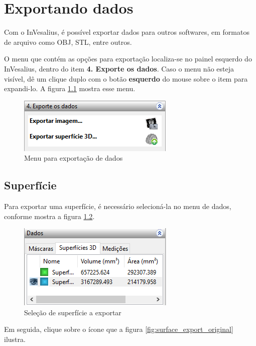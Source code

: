 \chapter{Exportando dados}

Com o InVesalius, é possível exportar dados para outros softwares, em formatos de arquivo
como OBJ, STL, entre outros.

O menu que contém as opções para exportação localiza-se no painel esquerdo do InVesalius,
dentro do item \textbf{4. Exporte os dados}. Caso o menu não esteja visível, dê um clique
duplo com o botão \textbf{esquerdo} do mouse sobre o item para expandi-lo. A figura
\ref{fig:data_export} mostra esse menu.

\begin{figure}[!htb]
\centering
\includegraphics[scale=0.8]{../user_guide_figures/invesalius_screen/painel_data_export_pt.png}
\caption{Menu para exportação de dados}
\label{fig:data_export}
\end{figure}

\section{Superfície}

Para exportar uma superfície, é necessário selecioná-la no menu de dados, conforme mostra a
figura \ref{fig:data_export_selection}.

\newpage

\begin{figure}[!htb]
\centering
\includegraphics[scale=0.7]{../user_guide_figures/invesalius_screen/painel_data_export_selection_pt.png}
\caption{Seleção de superfície a exportar}
\label{fig:data_export_selection}
\end{figure}

Em seguida, clique sobre o ícone que a figura \ref{fig:surface_export_original} ilustra.

